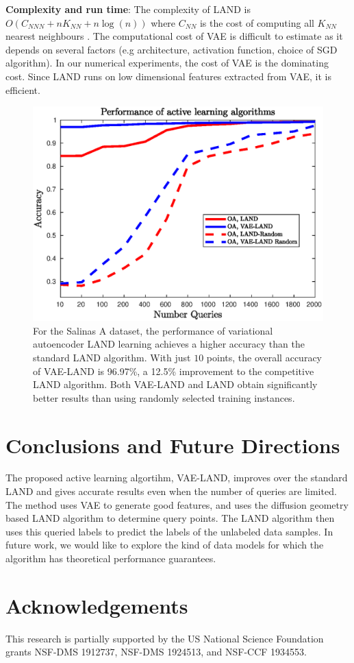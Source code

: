 \documentclass{article}
\begin{document}
\noindent \textbf{Complexity and run time}: The complexity of LAND is $O(C_{NNN}+nK_{NN}+n\log(n))$ where $C_{NN}$ is the cost of computing all $K_{NN}$ nearest neighbours \cite{Maggioni2019_LAND}. 
The computational cost of VAE is difficult to estimate as it depends on several factors (e.g architecture, activation function, choice of SGD algorithm). In our numerical experiments, the cost of VAE is the dominating cost. Since LAND runs on low dimensional features extracted from VAE, it is efficient. 

\begin{figure}
    \includegraphics[width=.45\textwidth]{Images/salinasa_results_improved.eps}
    \caption{For the Salinas A dataset, the performance of variational autoencoder LAND learning achieves a higher accuracy than the standard LAND algorithm. With just $10$ points, the overall accuracy of VAE-LAND is 96.97\%, a 12.5\% improvement to the competitive LAND algorithm. Both VAE-LAND and LAND obtain significantly better results than using randomly selected training instances. }
    \label{fig:my_label}
\end{figure}


\section{Conclusions and Future Directions}
\label{sec:Conclusions}
The proposed active learning algortihm, VAE-LAND, improves over the standard LAND and gives accurate results even when the number of queries are limited. The method uses VAE to generate good features, and uses the diffusion geometry based LAND algorithm to determine query points. The LAND algorithm then uses this queried labels to predict the labels of the unlabeled data samples. In future work, we would like to explore the kind of data models for which the algorithm has theoretical performance guarantees.   
\section*{Acknowledgements}

This research is partially supported by the US National Science Foundation grants NSF-DMS 1912737, NSF-DMS 1924513, and NSF-CCF 1934553.






\end{document}
